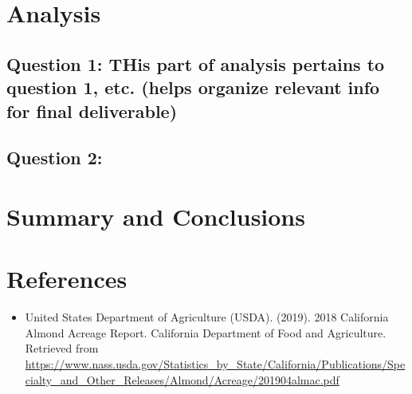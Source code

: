 \documentclass[12pt,]{article}
\providecommand{\tightlist}{%
  \setlength{\itemsep}{0pt}\setlength{\parskip}{0pt}}
\begin{document}
\newpage

\section{Analysis}\label{analysis}

\subsection{\texorpdfstring{Question 1: THis part of analysis pertains
to question 1, etc. (helps organize relevant info for final
deliverable)}{Question 1:  THis part of analysis pertains to question 1, etc. (helps organize relevant info for final deliverable)}}\label{question-1-this-part-of-analysis-pertains-to-question-1-etc.-helps-organize-relevant-info-for-final-deliverable}

\subsection{Question 2:}\label{question-2}

\newpage

\section{Summary and Conclusions}\label{summary-and-conclusions}

\newpage

\section{References}\label{references}

\begin{itemize}
\tightlist
\item
  United States Department of Agriculture (USDA). (2019). 2018
  California Almond Acreage Report. California Department of Food and
  Agriculture. Retrieved from
  \url{https://www.nass.usda.gov/Statistics_by_State/California/Publications/Specialty_and_Other_Releases/Almond/Acreage/201904almac.pdf}
\end{itemize}
\end{document}
